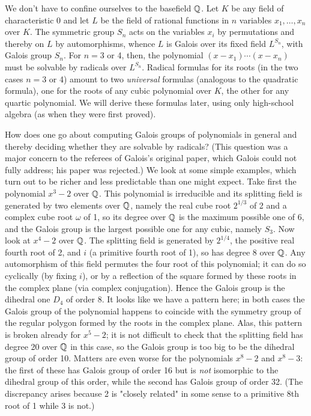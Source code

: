 We don't have to confine ourselves to the basefield $\Bbb Q$.  Let $K$ be any field of characteristic 0 and let $L$ be the field of rational functions in $n$ variables $x_1,\ldots,x_n$ over $K$.  The symmetric group $S_n$ acts on the variables $x_i$ by permutations and thereby on $L$ by automorphisms, whence $L$ is Galois over its fixed field $L^{S_n}$, with Galois group $S_n$.  For $n=3$ or 4, then, the polynomial $(x-x_1)\cdots(x-x_n)$ must be solvable by radicals over $L^{S_n}$.  Radical formulas for its roots (in the two cases $n=3$ or 4) amount to two {\sl universal} formulas (analogous to the quadratic formula), one for the roots of any cubic polynomial over $K$, the other for any quartic polynomial.  We will derive these formulas later, using only high-school algebra (as when they were first proved).

How does one go about computing Galois groups of polynomials in general and thereby deciding whether they are solvable by radicals? (This question was a major concern to the referees of Galois's original paper, which Galois could not fully address; his paper was rejected.)  We look at some simple examples, which turn out to be richer and less predictable than one might expect.  Take first the polynomial $x^3 - 2$ over $\Bbb Q$.  This polynomial is irreducible and its splitting field is generated by two elements over $\Bbb Q$, namely the real cube root $2^{1/3}$ of 2 and a complex cube root 
$\omega$ of 1, so its degree over $\Bbb Q$ is the maximum possible one of 6, and the Galois group is the largest possible one for any cubic, namely $S_3$.  Now look at $x^4 - 2$ over $\Bbb Q$.  The splitting field is generated by $2^{1/4}$, the positive real fourth root of 2, and $i$ (a primitive fourth root of 1), so has degree 8 over $\Bbb Q$.  Any automorphism of this field permutes the four root of this polynomial; it can do so cyclically (by fixing $i$), or by a reflection of the square formed by these roots in the complex plane (via complex conjugation).  Hence the Galois group is the dihedral one $D_4$ of order 8.  It looks like we have a pattern here; in both cases the Galois group of the polynomial happens to coincide with the symmetry group of the regular polygon formed by the roots in the complex plane.  Alas, this pattern is broken already for $x^5 - 2$; it is not difficult to check that the splitting field has degree 20 over $\Bbb Q$ in this case, so the Galois group is too big to be the dihedral group of order 10.  Matters are even worse for the polynomials $x^8 - 2$ and $x^8 - 3$:  the first of these has Galois group of order 16 but is {\sl not} isomorphic to the dihedral group of this order, while the second has Galois group of order 32.  (The discrepancy arises because 2 is "closely related" in some sense to a primitive 8th root of 1 while 3 is not.)  